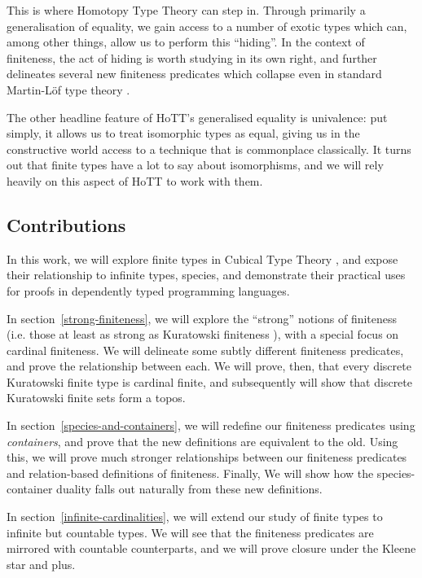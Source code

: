 \begin{refsection}
This is where Homotopy Type Theory \cite{hottbook} can step in.
Through primarily a generalisation of equality, we gain access to a number of
exotic types which can, among other things, allow us to perform this ``hiding''.
In the context of finiteness, the act of hiding is worth studying in its own
right, and further delineates several new finiteness predicates which collapse
even in standard Martin-Löf type theory
\cite{martin-lofIntuitionisticTypeTheory1980}.

The other headline feature of HoTT's generalised equality is univalence: put
simply, it allows us to treat isomorphic types as equal, giving us in the
constructive world access to a technique that is commonplace classically.
It turns out that finite types have a lot to say about isomorphisms, and we will
rely heavily on this aspect of HoTT to work with them.
\subsection{Contributions}
In this work, we will explore finite types in Cubical Type Theory
\cite{cohenCubicalTypeTheory2016}, and expose their relationship to infinite
types, species, and demonstrate their practical uses for proofs in dependently
typed programming languages.

In section~\ref{strong-finiteness}, we will explore the ``strong'' notions of
finiteness (i.e. those at least as strong as Kuratowski finiteness
\cite{kuratowskiNotionEnsembleFini1920}), with a special focus on cardinal
finiteness.
We will delineate some subtly different finiteness predicates, and prove the
relationship between each.
We will prove, then, that every discrete Kuratowski finite type is cardinal
finite, and subsequently will show that discrete Kuratowski finite sets form a
topos.

In section~\ref{species-and-containers}, we will redefine our finiteness
predicates using \emph{containers}, and prove that the new definitions are
equivalent to the old.
Using this, we will prove much stronger relationships between our finiteness
predicates and relation-based definitions of finiteness.
Finally, We will show how the species-container duality falls out naturally from
these new definitions.

In section~\ref{infinite-cardinalities}, we will extend our study of finite
types to infinite but countable types.
We will see that the finiteness predicates are mirrored with countable
counterparts, and we will prove closure under the Kleene star and plus.


\end{refsection}
